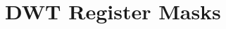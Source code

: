 \hypertarget{group___d_w_t___register___masks}{}\section{D\+WT Register Masks}
\label{group___d_w_t___register___masks}
